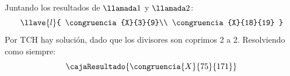 \bigskip

Juntando los resultados de $\llamada1$ y $\llamada2$:
$$
  \llave{l}{
    \congruencia{X}{3}{9}\\
    \congruencia{X}{18}{19}
  }
$$
Por TCH hay solución, dado que los divisores son coprimos 2 a 2. Resolviendo como
siempre:
$$
  \cajaResultado{
    \congruencia{X}{75}{171}
  }
$$

\begin{aportes}
  \item {}
\end{aportes}

